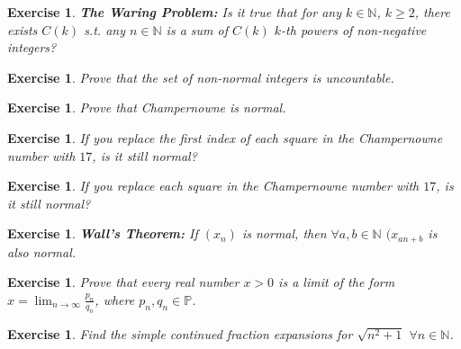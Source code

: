 \documentclass[10pt]{article}
\theoremstyle{plain}
\newtheorem{e}[Thm]{Exercise}
\begin{document}
\begin{e}
\textbf{The Waring Problem:} Is it true that for any $k \in \mathbb{N}$, $k \geq 2$, there exists $C(k)$ s.t. any $n \in \mathbb{N}$ is a sum of $C(k)$ $k$-th powers of non-negative integers?
\end{e}

\begin{e}
Prove that the set of non-normal integers is uncountable. 
\end{e}

\begin{e}
Prove that Champernowne is normal. 
\end{e}

\begin{e}
If you replace the first index of each square in the Champernowne number with $17$, is it still normal?
\end{e}

\begin{e}
If you replace each square in the Champernowne number with $17$, is it still normal?
\end{e}

\begin{e}
\textbf{Wall's Theorem: } If $(x_n)$ is normal, then $\forall a,b \in \mathbb{N}$ $(x_{an + b}$ is also normal. 
\end{e}

\begin{e}
Prove that every real number $x > 0$ is a limit of the form $x = \lim_{n \to \infty} \frac{p_n}{q_n}$, where $p_n,q_n \in \mathbb{P}$. 
\end{e}

\begin{e}
Find the simple continued fraction expansions for $\sqrt{n^2 + 1}$ $\forall n \in \mathbb{N}$. 
\end{e}
\end{document}
